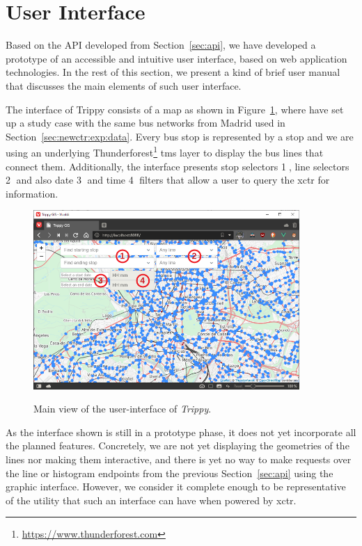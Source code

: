 	\section{User Interface}
	\label{sec:ui}
	Based on the API developed from Section~\ref{sec:api}, we have developed a prototype of an accessible and intuitive user interface, based on web application technologies. In the rest of this section, we present a kind of brief user manual that discusses the main elements of such user interface.
	
    The interface of Trippy consists of a map as shown in Figure~\ref{fig:ui:overall}, where have set up a study case with the same bus networks from Madrid used in Section~\ref{sec:newctr:exp:data}. Every bus stop is represented by a stop and we are using an underlying Thunderforest\footnote{\url{https://www.thunderforest.com}} \gls{tms} layer to display the bus lines that connect them. Additionally, the interface presents stop selectors {\large \textcircled{1}}, line selectors {\large \textcircled{2}} and also date {\large \textcircled{3}} and time {\large \textcircled{4}} filters that allow a user to query the \gls{xctr} for information.
    
    \begin{figure}[ht]
		\begin{center}
			{\includegraphics[width=0.9\textwidth]{screens/overall.png}}
		\end{center}
		\caption{Main view of the user-interface of {\em Trippy}.}
		\label{fig:ui:overall}
	\end{figure}
	
	As the interface shown is still in a prototype phase, it does not yet incorporate all the planned features. Concretely, we are not yet displaying the geometries of the lines nor making them interactive, and there is yet no way to make requests over the line or histogram endpoints from the previous Section~\ref{sec:api} using the graphic interface. However, we consider it complete enough to be representative of the utility that such an interface can have when powered by \gls{xctr}.
	
